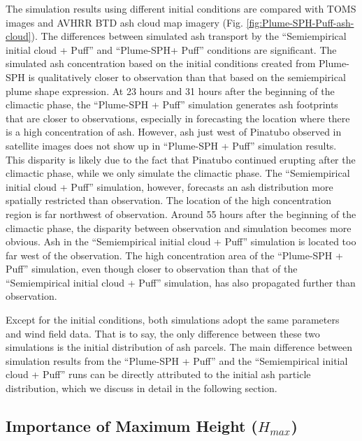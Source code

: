 \documentclass[utf8]{frontiersSCNS} %
\begin{document}
The simulation results using different initial conditions are compared with TOMS images and AVHRR BTD ash cloud map imagery (Fig. \ref{fig:Plume-SPH-Puff-ash-cloud}).  The differences between simulated ash transport by the ``Semiempirical initial cloud + Puff'' and ``Plume-SPH+ Puff'' conditions are significant. The simulated ash concentration based on the initial conditions created from Plume-SPH is qualitatively closer to observation than that based on the semiempirical plume shape expression. At 23 hours and 31 hours after the beginning of the climactic phase, the ``Plume-SPH + Puff'' simulation generates ash footprints that are  closer to observations, especially in forecasting the location where there is a high concentration of ash. However, ash just west of Pinatubo observed in satellite images does not show up in ``Plume-SPH + Puff'' simulation results. This disparity is likely due to the fact that Pinatubo continued erupting after the climactic phase, while we only simulate the climactic phase. The ``Semiempirical initial cloud + Puff'' simulation, however, forecasts an ash distribution more spatially restricted than observation. The location of the high concentration region is far northwest of observation.  Around 55 hours after the beginning of the climactic phase, the disparity between observation and simulation becomes more obvious. Ash in the ``Semiempirical initial cloud + Puff'' simulation is located too far west of the observation. The high concentration area of the ``Plume-SPH + Puff'' simulation, even though closer to observation than that of the ``Semiempirical initial cloud + Puff'' simulation, has also propagated further than observation.

Except for the initial conditions, both simulations adopt the same parameters and wind field data. That is to say, the only difference between these two simulations is the initial distribution of ash parcels. The main difference between simulation results from the ``Plume-SPH + Puff'' and the ``Semiempirical initial cloud + Puff'' runs can be directly attributed to the initial ash particle distribution, which we discuss in detail in the following section.

\subsection{Importance of Maximum Height ($H_{max}$)}
\end{document}

